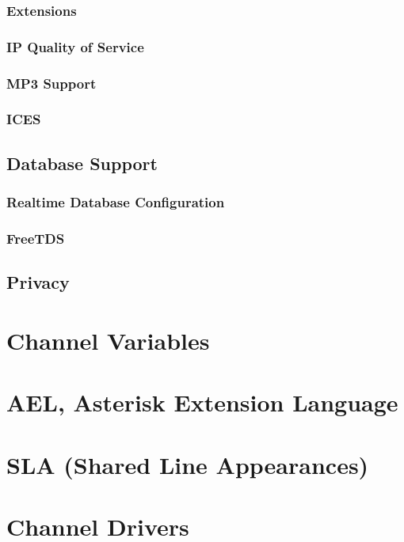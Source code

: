 \documentclass[12pt,a4]{report}
\begin{document}
    \subsection{Extensions}
    
    \subsection{IP Quality of Service}
    
    \subsection{MP3 Support}
    
    \subsection{ICES}
    
  \section{Database Support}
    \subsection{Realtime Database Configuration}
    
    \subsection{FreeTDS}
    
  \section{Privacy}
  

\chapter{Channel Variables}


\chapter{AEL, Asterisk Extension Language}


\chapter{SLA (Shared Line Appearances)}


\chapter{Channel Drivers}
\end{document}
